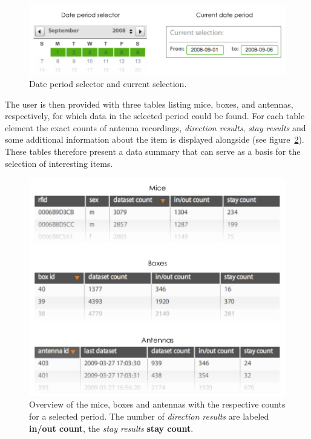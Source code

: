 \begin{figure}[htpb]
\begin{center}
  \includegraphics[width=.75\textwidth]{assets/pdf/date_period.pdf}
  \caption[Date period selector]{Date period selector and current selection.}
  \label{fig:date_period}
\end{center}
\end{figure}

The user is then provided with three tables listing mice, boxes, and antennas, respectively, for which data in the selected period could be found. For each table element the exact counts of antenna recordings, \textit{direction results}, \textit{stay results} and some additional information about the item is displayed alongside (see figure~\ref{fig:data_overview_with_count}). These tables therefore present a data summary that can serve as a basis for the selection of interesting items. 

\begin{figure}[htpb]
\begin{center}
  \includegraphics[width=.66\textwidth]{assets/pdf/overview_list.pdf}
  \caption[Overview of the summarized data for mice, boxes and antennas within a date period]{Overview of the mice, boxes and antennas with the respective counts for a selected period. The number of \textit{direction results} are labeled \textbf{in/out count}, the \textit{stay results}  \textbf{stay count}.}
  \label{fig:data_overview_with_count}
\end{center}
\end{figure}

